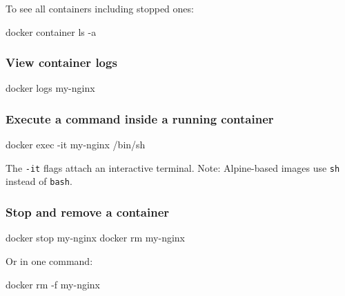 \documentclass[11pt,american,a4paper,openany]{book}
\newenvironment{Shaded}{}{}
\newcommand{\NormalTok}[1]{#1}
\begin{document}
To see all containers including stopped ones:

\begin{Shaded}
\begin{Highlighting}[]
\NormalTok{docker container ls {-}a}
\end{Highlighting}
\end{Shaded}

\subsubsection{View container logs}\label{view-container-logs}

\begin{Shaded}
\begin{Highlighting}[]
\NormalTok{docker logs my{-}nginx}
\end{Highlighting}
\end{Shaded}

\subsubsection{Execute a command inside a running
container}\label{execute-a-command-inside-a-running-container}

\begin{Shaded}
\begin{Highlighting}[]
\NormalTok{docker exec {-}it my{-}nginx /bin/sh}
\end{Highlighting}
\end{Shaded}

The \texttt{-it} flags attach an interactive terminal. Note:
Alpine-based images use \texttt{sh} instead of \texttt{bash}.

\subsubsection{Stop and remove a
container}\label{stop-and-remove-a-container}

\begin{Shaded}
\begin{Highlighting}[]
\NormalTok{docker stop my{-}nginx}
\NormalTok{docker rm my{-}nginx}
\end{Highlighting}
\end{Shaded}

Or in one command:

\begin{Shaded}
\begin{Highlighting}[]
\NormalTok{docker rm {-}f my{-}nginx}
\end{Highlighting}
\end{Shaded}
\end{document}
